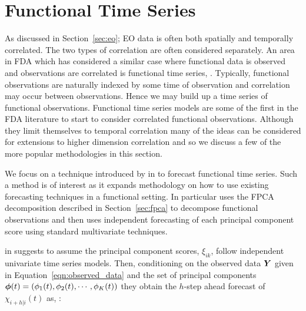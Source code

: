 \section{Functional Time Series\label{sec:fts}}
As discussed in Section~\ref{sec:eo}; EO data is often both spatially and temporally correlated.
The two types of correlation are often considered separately. 
An area in FDA which has considered a similar case where functional data is observed and observations are correlated is functional time series, \citep{aguilera_forecasting_1999}. Typically, functional observations are naturally indexed by some time of observation and correlation may occur between observations.
Hence we may build up a time series of functional observations.
Functional time series models are some of the first in the FDA literature to start to consider correlated functional observations.
Although they limit themselves to temporal correlation many of the ideas can be considered for extensions to higher dimension correlation and so we discuss a few of the more popular methodologies in this section.

We focus on a technique introduced by \citeauthor{hyndman_forecasting_2009} in \citep{hyndman_forecasting_2009} to forecast functional time series.
Such a method is of interest as it expands methodology on how to use existing forecasting techniques in a functional setting.
In particular \citep{hyndman_forecasting_2009} uses the FPCA decomposition described in Section~\ref{sec:fpca} to decompose functional observations and then uses independent forecasting of each principal component score using standard multivariate techniques.

\citeauthor{hyndman_robust_2007} in \citep{hyndman_robust_2007} suggests to assume the principal component scores, $\xi_{ik}$, follow independent univariate time series models.
Then, conditioning on the observed data $\bm{{Y}}$ given in Equation~\eqref{eqn:observed_data} and the set of principal components $\bm{{\phi}}(t) = \left(\phi_1(t), \phi_2(t), \cdots, \phi_K(t)\right)$ they obtain the $h$-step ahead forecast of $\chi_{i+h | i}(t)$ as, \citep{hyndman_robust_2007}:

